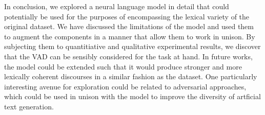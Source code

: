 \documentclass[12pt,twoside]{report}
\begin{document}
In conclusion, we explored a neural language model in detail that could potentially be used for the purposes of encompassing the lexical variety of the original dataset. We have discussed the limitations of the model and used them to augment the components in a manner that allow them to work in unison. By subjecting them to quantitiative and qualitative experimental results, we discover that the VAD can be sensibly considered for the task at hand. In future works, the model could be extended such that it would produce stronger and more lexically coherent discourses in a similar fashion as the dataset. One particularly interesting avenue for exploration could be related to adversarial approaches, which could be used in unison with the model to improve the diversity of artficial text generation.










\begin{small}
 
\end{small}
\end{document}
